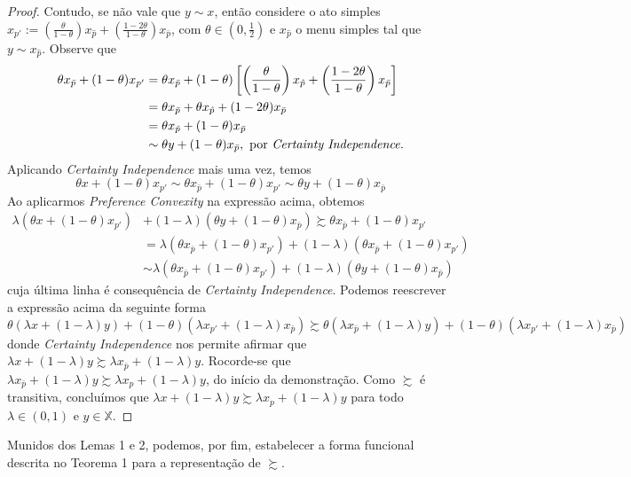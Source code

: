 \documentclass[11pt, a4paper]{article}
\theoremstyle{nonumberplain}
\newtheorem{proof}{Dem.}
\theoremstyle{plain}
\theoremstyle{plain}
\theoremstyle{plain}
\begin{document}
\begin{proof}
Contudo, se não vale que $y\sim x$, então considere o ato simples $x_{p'}:=\left(\frac{\theta}{1-\theta}\right)x_{\hat{p}}+\left(\frac{1-2\theta}{1-\theta}\right)x_{\bar{p}}$, com $\theta\in \left(0,\frac{1}{2}\right)$ e $x_{\hat{p}}$ o menu simples tal que $y\sim x_{\hat{p}}$. Observe que   
\begin{align*}
\theta x_{\bar{p}} + (1-\theta)x_{p'}&=\theta x_{\bar{p}} + (1-\theta)\left[ \left(\frac{\theta}{1-\theta}\right)x_{\hat{p}}+\left(\frac{1-2\theta}{1-\theta}\right)x_{\bar{p}}\right] \\ 
&=\theta x_{\bar{p}} + \theta x_{\hat{p}} + (1-2\theta)x_{\bar{p}} \\
&=\theta x_{\hat{p}} + (1-\theta)x_{\bar{p}} \\
&\sim \theta y + (1-\theta) x_{\bar{p}}, \text{ por \emph{Certainty Independence.}}
\end{align*}
Aplicando \emph{Certainty Independence} mais uma vez, temos $$\theta x + (1-\theta)x_{p'}\sim \theta x_{\bar{p}} + (1-\theta)x_{p'}\sim \theta y + (1-\theta) x_{\bar{p}}$$
Ao aplicarmos \emph{Preference Convexity} na expressão acima, obtemos 
\begin{align*}
\lambda (\theta x + (1-\theta)x_{p'})&+(1-\lambda)(\theta y + (1-\theta) x_{\bar{p}}) \succsim \theta x_{\bar{p}} + (1-\theta)x_{p'}\\
&= \lambda (\theta x_{\bar{p}} + (1-\theta)x_{p'}) + (1-\lambda)(\theta x_{\bar{p}} + (1-\theta)x_{p'})\\
&\sim \lambda(\theta x_{\bar{p}} + (1-\theta)x_{p'})+(1-\lambda)(\theta y + (1-\theta) x_{\bar{p}})
\end{align*}
cuja última linha é consequência de \emph{Certainty Independence}. Podemos reescrever a expressão acima da seguinte forma
$$ \theta (\lambda x + (1-\lambda)y)+(1-\theta)(\lambda x_{p'}+(1-\lambda)x_{\bar{p}}) \succsim \theta (\lambda x_{\bar{p}} + (1-\lambda)y)+(1-\theta)(\lambda x_{p'}+(1-\lambda)x_{\bar{p}})$$
donde \emph{Certainty Independence} nos permite afirmar que $\lambda x + (1-\lambda)y\succsim \lambda x_{\bar{p}} + (1-\lambda)y$. Rocorde-se que $\lambda x_{\bar{p}} + (1-\lambda)y\succsim \lambda x_p + (1-\lambda)y$, do início da demonstração. Como $\succsim$ é transitiva, concluímos que $\lambda x + (1-\lambda)y\succsim \lambda x_p + (1-\lambda)y$ para todo $\lambda \in (0,1)$ e $y\in \mathbb{X}$.
\end{proof}
Munidos dos Lemas 1 e 2, podemos, por fim, estabelecer a forma funcional descrita no Teorema 1 para a representação de $\succsim$. \\
\end{document}
